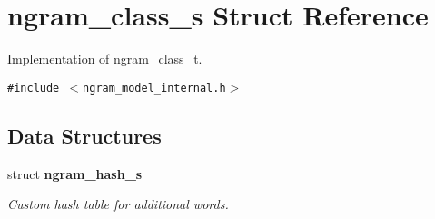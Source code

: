 \section{ngram\_\-class\_\-s Struct Reference}
\label{structngram__class__s}
Implementation of ngram\_\-class\_\-t.  


{\tt \#include $<$ngram\_\-model\_\-internal.h$>$}

\subsection*{Data Structures}
\begin{CompactItemize}
\item 
struct {\bf ngram\_\-hash\_\-s}
\begin{CompactList}\small\item\em Custom hash table for additional words. \item\end{CompactList}\end{CompactItemize}

